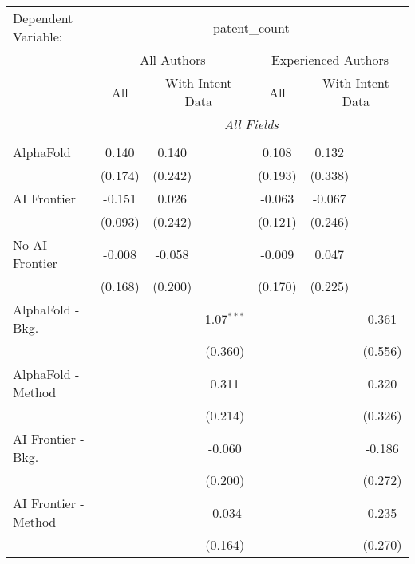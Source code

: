 \begingroup
\centering
\begin{tabular}{lcccccc}
   \tabularnewline \midrule \midrule
   Dependent Variable: & \multicolumn{6}{c}{patent\_count}\\
 & \multicolumn{3}{c}{All Authors} & \multicolumn{3}{c}{Experienced Authors} \\
\cmidrule(lr){2-4} \cmidrule(lr){5-7}
 & \multicolumn{1}{c}{All} & \multicolumn{2}{c}{With Intent Data} & \multicolumn{1}{c}{All} & \multicolumn{2}{c}{With Intent Data} \\
\cmidrule(lr){2-2} \cmidrule(lr){3-4} \cmidrule(lr){5-5} \cmidrule(lr){6-7}
 & \multicolumn{6}{c}{\textit{All Fields}} \\ \\
   AlphaFold               & 0.140   & 0.140   &              & 0.108   & 0.132   &   \\   
                           & (0.174) & (0.242) &              & (0.193) & (0.338) &   \\   
   AI Frontier             & -0.151  & 0.026   &              & -0.063  & -0.067  &   \\   
                           & (0.093) & (0.242) &              & (0.121) & (0.246) &   \\   
   No AI Frontier          & -0.008  & -0.058  &              & -0.009  & 0.047   &   \\   
                           & (0.168) & (0.200) &              & (0.170) & (0.225) &   \\   
   AlphaFold - Bkg.        &         &         & 1.07$^{***}$ &         &         & 0.361\\   
                           &         &         & (0.360)      &         &         & (0.556)\\   
   AlphaFold - Method      &         &         & 0.311        &         &         & 0.320\\   
                           &         &         & (0.214)      &         &         & (0.326)\\   
   AI Frontier - Bkg.      &         &         & -0.060       &         &         & -0.186\\   
                           &         &         & (0.200)      &         &         & (0.272)\\   
   AI Frontier - Method    &         &         & -0.034       &         &         & 0.235\\   
                           &         &         & (0.164)      &         &         & (0.270)\\   

\end{tabular}
